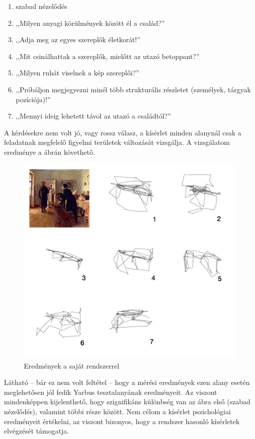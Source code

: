 \begin{enumerate}
 \item szabad nézelődés
 \item ,,Milyen anyagi körülmények között él a család?''
 \item ,,Adja meg az egyes szereplők életkorát!''
 \item ,,Mit csinálhattak a szereplők, mielőtt az utazó betoppant?''
 \item ,,Milyen ruhát viselnek a kép szereplői?''
 \item ,,Próbáljon megjegyezni minél több strukturális részletet (személyek, tárgyak pozíciója)!''
 \item ,,Mennyi ideig lehetett távol az utazó a családtól?''
\end{enumerate}

A kérdésekre nem volt jó, vagy rossz válasz, a kísérlet minden alanynál csak a feladatnak megfelelő figyelmi területek változását vizsgálja. A vizsgálatom eredménye a  ábrán követhető.

\begin{figure}[!ht]
\centering
\includegraphics[width=140mm, keepaspectratio]{figures/yarbus_eredmeny.png}
\caption{Eredmények a saját rendszerrel}
\label{fig:eredmeny}
\end{figure}

Látható -- bár ez nem volt feltétel -- hogy a mérési eredmények ezen alany esetén meglehetősen jól fedik Yarbus tesztalanyának eredményeit. Az viszont mindenképpen kijelenthető, hogy szignifikáns különbség van az ábra első (szabad nézelődés), valamint többi része között. Nem célom a kísérlet pszichológiai eredményeit értékelni, az viszont bizonyos, hogy a rendszer hasonló kísérletek elvégzését támogatja.

